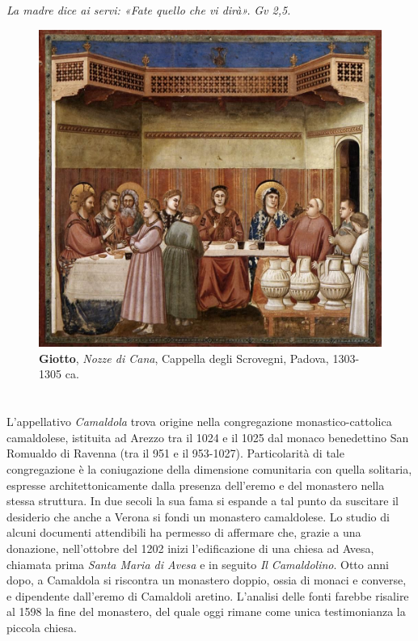 \documentclass[10pt,b6paper,usenames,twoside]{article}
\begin{document}
\noindent \textit{La madre dice ai servi: «Fate quello che vi dirà».} \hfill
\textcolor{forestgreen(traditional)}{\textit{Gv 2,5.}} \\
\begin{figure}
\label{fig1}
\centering
\caption*{\small{\textbf{Giotto}, \textit{Nozze di Cana}, Cappella degli Scrovegni, Padova, 1303-1305 ca.}}
\includegraphics[scale=0.17, trim=0mm 0mm 0mm 0mm, clip=true]{giotto-scrovegni.jpg}
\end{figure}

\clearpage

\section*{\textcolor{forestgreen(traditional)}{}} 
L’appellativo \textit{Camaldola} trova origine nella congregazione monastico-cattolica camaldolese, istituita ad Arezzo tra il 1024 e il 1025 dal monaco benedettino San Romualdo di Ravenna (tra il 951 e il 953-1027). Particolarità di tale congregazione è la coniugazione della dimensione comunitaria con quella solitaria, espresse architettonicamente dalla presenza dell’eremo e del monastero nella stessa struttura. In due secoli la sua fama si espande a tal punto da suscitare il desiderio che anche a Verona si fondi un monastero camaldolese. Lo studio di alcuni documenti attendibili ha permesso di affermare che, grazie a una donazione, nell’ottobre del 1202 inizi l’edificazione di una chiesa ad Avesa, chiamata prima \textit{Santa Maria di Avesa} e in seguito \textit{Il Camaldolino}. Otto anni dopo, a Camaldola si riscontra un monastero doppio, ossia di monaci e converse, e dipendente dall’eremo di Camaldoli aretino. L’analisi delle fonti farebbe risalire al 1598 la fine del monastero, del quale oggi rimane come unica testimonianza la piccola chiesa.\\
\end{document}
